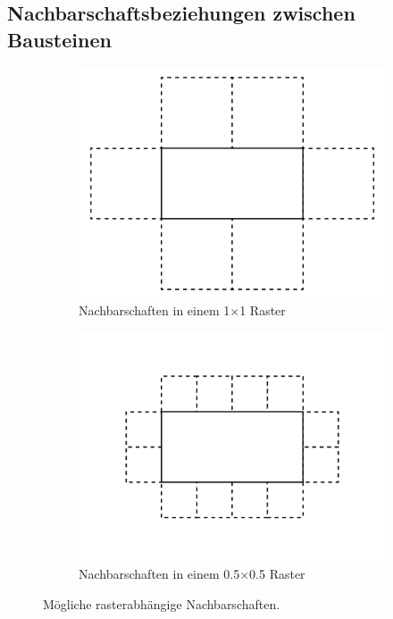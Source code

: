 \subsection{Nachbarschaftsbeziehungen zwischen Bausteinen}
\begin{figure}[h!bt]
  \begin{subfigure}[b]{0.5\columnwidth}
    \includegraphics[width=\columnwidth]{fig/raster_neighbors1.png}
    \caption{Nachbarschaften in einem 1$\times$1 Raster}
    \label{fig:real:raster_neigbors1}
  \end{subfigure}
  \hfill
  \begin{subfigure}[b]{0.5\columnwidth}
    \includegraphics[width=\columnwidth]{fig/raster_neighbors2.png}
    \caption{Nachbarschaften in einem 0.5$\times$0.5 Raster}
    \label{fig:real:raster_neigbors2}
  \end{subfigure}
  \caption{Mögliche rasterabhängige Nachbarschaften.}
  \label{fig:real:raster_neigbors}
\end{figure}

